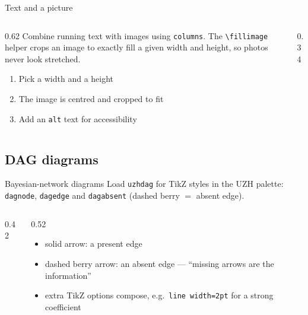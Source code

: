 \documentclass[aspectratio=169,onlytextwidth]{beamer}
\begin{document}
\begin{frame}{Text and a picture}
  \begin{columns}
    \begin{column}{0.62\textwidth}
      Combine running text with images using \texttt{columns}. The
      \texttt{\textbackslash fillimage} helper crops an image to exactly fill a
      given width and height, so photos never look stretched.

      \begin{enumerate}
        \item Pick a width and a height
        \item The image is centred and cropped to fit
        \item Add an \texttt{alt} text for accessibility
      \end{enumerate}
    \end{column}
    \begin{column}{0.34\textwidth}
    \end{column}
  \end{columns}
\end{frame}

\subsection{DAG diagrams}

\begin{frame}{Bayesian-network diagrams}
  Load \texttt{uzhdag} for TikZ styles in the UZH palette: \texttt{dagnode},
  \texttt{dagedge} and \texttt{dagabsent} (dashed berry $=$ absent edge).

  \begin{columns}
    \begin{column}{0.42\textwidth}
      \centering
    \end{column}
    \begin{column}{0.52\textwidth}
      \begin{itemize}
        \item solid arrow: a present edge
        \item dashed berry arrow: an absent edge --- ``missing arrows are
          the information''
        \item extra TikZ options compose, e.g.\
          \texttt{line width=2pt} for a strong coefficient
      \end{itemize}
    \end{column}
  \end{columns}
\end{frame}
\end{document}
